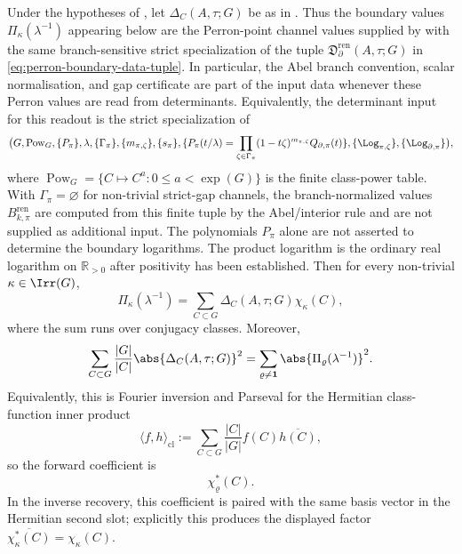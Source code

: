 \begin{theorem}
  \label{thm:class-mertens-fourier}
  Under the hypotheses of , let
  \(\Delta_C(A,\tau;G)\) be as in .
  Thus the boundary values \(\Pi_\kappa(\lambda^{-1})\) appearing below
  are the Perron-point channel values supplied by
   with the same branch-sensitive strict
  specialization of the tuple
  \(\mathfrak D_{\partial}^{\mathrm{ren}}(A,\tau;G)\) in
  \eqref{eq:perron-boundary-data-tuple}.  In particular, the Abel branch
  convention, scalar normalisation, and gap certificate are part of the input
  data whenever these Perron values are read from determinants.  Equivalently,
  the determinant input for this readout is the strict specialization of
  \[
    \bigl(G,\operatorname{Pow}_G,\{P_\pi\},\lambda,
      \{\Gamma_\pi\},\{m_{\pi,\zeta}\},\{s_\pi\},
      \{P_\pi(t/\lambda)=
        \prod_{\zeta\in\Gamma_\pi}(1-t\zeta)^{m_{\pi,\zeta}}
        Q_{\partial,\pi}(t)\},\{\Log_{\pi,\zeta}\},
        \{\Log_{\partial,\pi}\}\bigr),
  \]
  where \(\operatorname{Pow}_G=\{C\mapsto C^a:0\le a<\exp(G)\}\) is the
  finite class-power table.  With \(\Gamma_\pi=\varnothing\) for non-trivial strict-gap channels, the
  branch-normalized values \(B_{k,\pi}^{\mathrm{ren}}\) are computed from this
  finite tuple by the Abel/interior rule and are not supplied as additional
  input.  The polynomials \(P_\pi\) alone are not asserted to determine the
  boundary logarithms.  The product logarithm is the ordinary real logarithm
  on \(\mathbb R_{>0}\) after positivity has been established.
  Then
  for every non-trivial \(\kappa\in\Irr(G)\),
  \begin{equation}\label{eq:class-mertens-fourier-inversion}
    \Pi_\kappa(\lambda^{-1})
    =
    \sum_{C\subset G}\Delta_C(A,\tau;G)\chi_\kappa(C),
  \end{equation}
  where the sum runs over conjugacy classes. Moreover,
  \begin{equation}\label{eq:class-mertens-plancherel}
    \sum_{C\subset G}\frac{|G|}{|C|}\abs{\Delta_C(A,\tau;G)}^2
    =
    \sum_{\varrho\neq\mathbf 1}
      \abs{\Pi_\varrho(\lambda^{-1})}^2.
  \end{equation}
  Equivalently, this is Fourier inversion and Parseval for the Hermitian
  class-function inner product
  \[
    \langle f,h\rangle_{\mathrm{cl}}
    :=
    \sum_{C\subset G}\frac{|C|}{|G|}f(C)\overline{h(C)},
  \]
  so the forward coefficient is
  \[
    \chi_\varrho^\ast(C).
  \]
  In the inverse recovery, this coefficient is paired with the
  same basis vector in the Hermitian second slot; explicitly this produces
  the displayed factor
  \(\overline{\chi_\kappa^\ast(C)}=\chi_\kappa(C)\).
\end{theorem}

